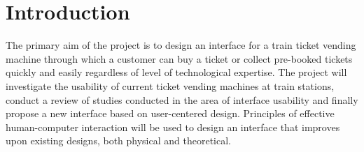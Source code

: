 \section{Introduction}\label{Int}
The primary aim of the project is to design an interface for a train ticket vending machine through which a customer can buy a ticket or collect pre-booked tickets quickly and easily regardless of level of technological expertise. 
The project will investigate the usability of current ticket vending machines at train stations, conduct a review of studies conducted in the area of interface usability and finally propose a new interface based on user-centered design. Principles of effective human-computer interaction will be used to design an interface that improves upon existing designs, both physical and theoretical. 







